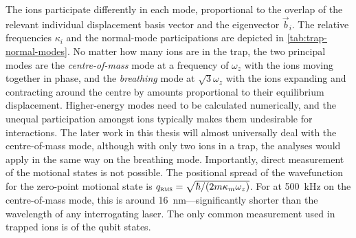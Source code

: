 The ions participate differently in each mode, proportional to the overlap of the relevant individual displacement basis vector and the eigenvector $\vec b_i$.
The relative frequencies $\kappa_i$ and the normal-mode participations are depicted in \cref{tab:trap-normal-modes}.
No matter how many ions are in the trap, the two principal modes are the \emph{centre-of-mass} mode at a frequency of $\omega_z$ with the ions moving together in phase, and the \emph{breathing} mode at $\sqrt3\omega_z$ with the ions expanding and contracting around the centre by amounts proportional to their equilibrium displacement.
Higher-energy modes need to be calculated numerically, and the unequal participation amongst ions typically makes them undesirable for interactions.  The later work in this thesis will almost universally deal with the centre-of-mass mode, although with only two ions in a trap, the analyses would apply in the same way on the breathing mode.  Importantly, direct measurement of the motional states is not possible.
The positional spread of the wavefunction for the zero-point motional state is $q_{\text{\textsc{rms}}} = \sqrt{\hbar/(2m\kappa_m\omega_z)}$.
For  at \qty{500}{\kilo\hertz} on the centre-of-mass mode, this is around \qty{16}{\nano\m}---significantly shorter than the wavelength of any interrogating laser.
The only common measurement used in trapped ions is of the qubit states.

